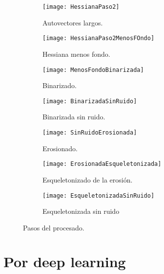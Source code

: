 \begin{figure}
	\begin{subfigure}[c]{.5\linewidth}
	\centering\large \texttt{[image: HessianaPaso2]}
	\caption{Autovectores largos.}
	\end{subfigure}%
	\begin{subfigure}[c]{.5\linewidth}
	\centering\large \texttt{[image: HessianaPaso2MenosFOndo]}
	\caption{Hessiana menos fondo.}
	\end{subfigure}%

	\begin{subfigure}[c]{.5\linewidth}
	\centering\large \texttt{[image: MenosFondoBinarizada]}
	\caption{Binarizado.}
	\end{subfigure}%
	\begin{subfigure}[c]{.5\linewidth}
	\centering\large \texttt{[image: BinarizadaSinRuido]}
	\caption{Binarizada sin ruido.}
	\end{subfigure}%

	\begin{subfigure}[c]{.5\linewidth}
	\centering\large \texttt{[image: SinRuidoErosionada]}
	\caption{Erosionado.}
	\end{subfigure}%
	\begin{subfigure}[c]{.5\linewidth}
	\centering\large \texttt{[image: ErosionadaEsqueletonizada]}
	\caption{Esqueletonizado de la erosión.}
	\end{subfigure}%
		
	\begin{subfigure}{.5\linewidth}
	\centering\large \texttt{[image: EsqueletonizadaSinRuido]}
	\caption{Esqueletonizada sin ruido}
	\end{subfigure}%
	

\caption{Pasos del procesado.}\label{fig:2.2}
\end{figure}







\section{Por deep learning}
